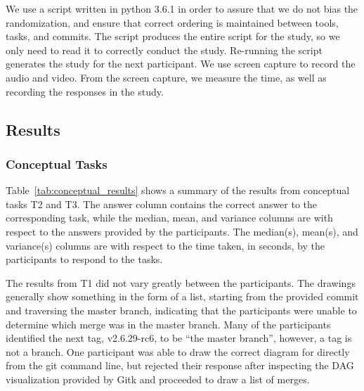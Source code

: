 We use a script written in python 3.6.1 in order to assure that we do
not bias the randomization, and ensure that correct ordering is
maintained between tools, tasks, and commits. The script produces the
entire script for the study, so we only need to read it to correctly
conduct the study. Re-running the script generates the study for the
next participant. We use screen capture to record the audio and video.
From the screen capture, we measure the time, as well as recording the
responses in the study.


\subsection{Results}
\label{sec:results}


\subsubsection{Conceptual Tasks}
\label{sub:conceptual_tasks}

Table~\ref{tab:conceptual_results} shows a summary of the results from
conceptual tasks T2 and T3. The answer column contains the correct
answer to the corresponding task, while the median, mean, and variance
columns are with respect to the answers provided by the
participants. The median(s), mean(s), and variance(s) columns are with
respect to the time taken, in seconds, by the participants to respond to
the tasks.


The results from T1 did not vary greatly between the participants. The
drawings generally show something in the form of a list, starting from
the provided commit and traversing the master branch, indicating that
the participants were unable to determine which merge was in the master
branch. Many of the participants identified the next tag, v2.6.29-rc6,
to be ``the master branch'', however, a tag is not a branch. One
participant was able to draw the correct diagram for \comA directly
from the git command line, but rejected their response after inspecting
the DAG visualization provided by Gitk and proceeded to draw a list of
merges.


